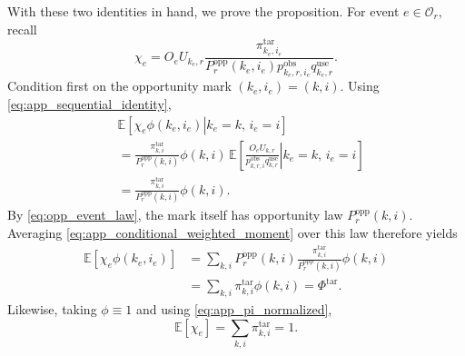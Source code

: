 With these two identities in hand, we prove the proposition.
For event $e\in\mathcal{O}_r$, recall
\begin{equation}
 \chi_e
 =
 O_eU_{k_e,r}
 \frac{
 \pi^{\mathrm{tar}}_{k_e,i_e}
 }{
 P_r^{\mathrm{opp}}(k_e,i_e)
 p^{\mathrm{obs}}_{k_e,r,i_e}
 q^{\mathrm{use}}_{k_e,r}
 }.
 \label{eq:app_chi}
\end{equation}
Condition first on the opportunity mark $(k_e,i_e)=(k,i)$.  Using
\eqref{eq:app_sequential_identity},
\begin{align}
 &\mathbb{E}
 \left[
 \left.
 \chi_e\phi(k_e,i_e)
 \right|
 k_e=k,\,
 i_e=i
 \right]
 \nonumber\\
 &=
 \frac{
 \pi^{\mathrm{tar}}_{k,i}
 }{
 P_r^{\mathrm{opp}}(k,i)
 }
 \phi(k,i)
 \,
 \mathbb{E}
 \left[
 \left.
 \frac{
 O_eU_{k,r}
 }{
 p^{\mathrm{obs}}_{k,r,i}
 q^{\mathrm{use}}_{k,r}
 }
 \right|
 k_e=k,\,
 i_e=i
 \right]
 \nonumber\\
 &=
 \frac{
 \pi^{\mathrm{tar}}_{k,i}
 }{
 P_r^{\mathrm{opp}}(k,i)
 }
 \phi(k,i).
 \label{eq:app_conditional_weighted_moment}
\end{align}
By \eqref{eq:opp_event_law}, the mark itself has opportunity law
$P_r^{\mathrm{opp}}(k,i)$.  Averaging
\eqref{eq:app_conditional_weighted_moment} over this law therefore yields
\begin{align}
 \mathbb{E}
 \left[
 \chi_e\phi(k_e,i_e)
 \right]
 &=
 \sum_{k,i}
 P_r^{\mathrm{opp}}(k,i)
 \frac{
 \pi^{\mathrm{tar}}_{k,i}
 }{
 P_r^{\mathrm{opp}}(k,i)
 }
 \phi(k,i)
 \nonumber\\
 &=
 \sum_{k,i}
 \pi^{\mathrm{tar}}_{k,i}\phi(k,i)
 =
 \Phi^{\mathrm{tar}}.
 \label{eq:app_expected_numerator_event}
\end{align}
Likewise, taking $\phi\equiv1$ and using
\eqref{eq:app_pi_normalized},
\begin{equation}
    \mathbb{E}[\chi_e]
    =
    \sum_{k,i}\pi^{\mathrm{tar}}_{k,i}
    =1.
    \label{eq:app_expected_denominator_event}
\end{equation}

